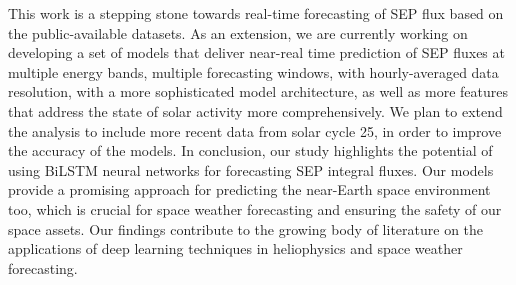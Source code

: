 This work is a stepping stone towards real-time forecasting of SEP flux based on the public-available datasets. As an extension, we are currently working on developing a set of models that deliver near-real time prediction of SEP fluxes at multiple energy bands, multiple forecasting windows, with hourly-averaged data resolution, with a more sophisticated model architecture, as well as more features that address the state of solar activity more comprehensively. 
We plan to extend the analysis to include more recent data from solar cycle 25, in order to improve the accuracy of the models.
In conclusion, our study highlights the potential of using BiLSTM neural networks for forecasting SEP integral fluxes. Our models provide a promising approach for predicting the near-Earth space environment too, which is crucial for space weather forecasting and ensuring the safety of our space assets. Our findings contribute to the growing body of literature on the applications of deep learning techniques in heliophysics and space weather forecasting.
